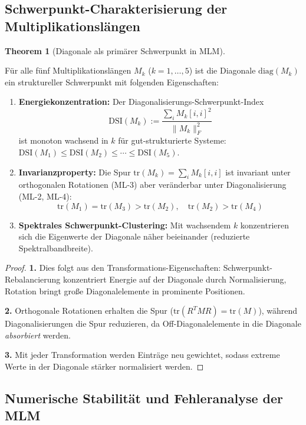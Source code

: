 \documentclass[a4paper,12pt]{article}
\theoremstyle{definition}
\newtheorem{theorem}{Theorem}
\begin{document}
\subsection{Schwerpunkt-Charakterisierung der Multiplikationslängen}

\begin{theorem}[Diagonale als primärer Schwerpunkt in MLM]
\label{thm:mlm_diagonal_schwerpunkt}

Für alle fünf Multiplikationslängen $M_k$ ($k = 1, \ldots, 5$) ist die Diagonale $\text{diag}(M_k)$ ein struktureller Schwerpunkt mit folgenden Eigenschaften:

\begin{enumerate}
\item \textbf{Energiekonzentration:} Der Diagonalisierungs-Schwerpunkt-Index
\[
\text{DSI}(M_k) := \frac{\sum_i M_k[i,i]^2}{\|M_k\|_F^2}
\]
ist monoton wachsend in $k$ für gut-strukturierte Systeme: $\text{DSI}(M_1) \leq \text{DSI}(M_2) \leq \cdots \leq \text{DSI}(M_5)$.

\item \textbf{Invarianzproperty:} Die Spur $\mathrm{tr}(M_k) = \sum_i M_k[i,i]$ ist invariant unter orthogonalen Rotationen (ML-3) aber veränderbar unter Diagonalisierung (ML-2, ML-4):
\[
\mathrm{tr}(M_1) = \mathrm{tr}(M_3) > \mathrm{tr}(M_2), \quad \mathrm{tr}(M_2) > \mathrm{tr}(M_4)
\]

\item \textbf{Spektrales Schwerpunkt-Clustering:} Mit wachsendem $k$ konzentrieren sich die Eigenwerte der Diagonale näher beieinander (reduzierte Spektralbandbreite).
\end{enumerate}

\begin{proof}
\textbf{1.} Dies folgt aus den Transformations-Eigenschaften: Schwerpunkt-Rebalancierung konzentriert Energie auf der Diagonale durch Normalisierung, Rotation bringt große Diagonalelemente in prominente Positionen.

\textbf{2.} Orthogonale Rotationen erhalten die Spur ($\mathrm{tr}(R^T M R) = \mathrm{tr}(M)$), während Diagonalisierungen die Spur reduzieren, da Off-Diagonalelemente in die Diagonale \emph{absorbiert} werden.

\textbf{3.} Mit jeder Transformation werden Einträge neu gewichtet, sodass extreme Werte in der Diagonale stärker normalisiert werden.
\end{proof}
\end{theorem}

\subsection{Numerische Stabilität und Fehleranalyse der MLM}
\end{document}

